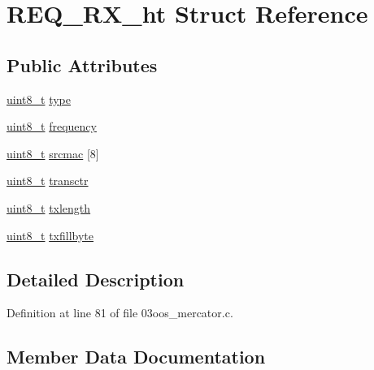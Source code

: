 \hypertarget{struct_r_e_q___r_x__ht}{}\section{R\+E\+Q\+\_\+\+R\+X\+\_\+ht Struct Reference}
\label{struct_r_e_q___r_x__ht}
\subsection*{Public Attributes}
\begin{DoxyCompactItemize}
\item 
\hyperlink{_p_e___types_8h_aba7bc1797add20fe3efdf37ced1182c5}{uint8\+\_\+t} \hyperlink{struct_r_e_q___r_x__ht_a384a121770156e4df291c738128e62fe}{type}
\item 
\hyperlink{_p_e___types_8h_aba7bc1797add20fe3efdf37ced1182c5}{uint8\+\_\+t} \hyperlink{struct_r_e_q___r_x__ht_ad453ca64bed2bf4c2bb4f097d983439b}{frequency}
\item 
\hyperlink{_p_e___types_8h_aba7bc1797add20fe3efdf37ced1182c5}{uint8\+\_\+t} \hyperlink{struct_r_e_q___r_x__ht_aee119a8dffde5a2ed45161ca7a3058fd}{srcmac} \mbox{[}8\mbox{]}
\item 
\hyperlink{_p_e___types_8h_aba7bc1797add20fe3efdf37ced1182c5}{uint8\+\_\+t} \hyperlink{struct_r_e_q___r_x__ht_aecf4f99602dc899d38a9ca58356ae32e}{transctr}
\item 
\hyperlink{_p_e___types_8h_aba7bc1797add20fe3efdf37ced1182c5}{uint8\+\_\+t} \hyperlink{struct_r_e_q___r_x__ht_a44ff0343f6c1dd6fa128f4b57ec7fcb0}{txlength}
\item 
\hyperlink{_p_e___types_8h_aba7bc1797add20fe3efdf37ced1182c5}{uint8\+\_\+t} \hyperlink{struct_r_e_q___r_x__ht_a65dcab1cd6aa1fd6b50bee87b65a4ee3}{txfillbyte}
\end{DoxyCompactItemize}


\subsection{Detailed Description}


Definition at line 81 of file 03oos\+\_\+mercator.\+c.



\subsection{Member Data Documentation}
